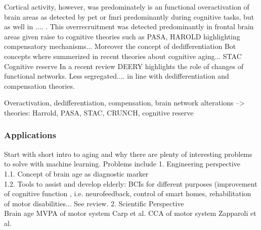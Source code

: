Cortical activity, however, was predominately  is an functional overactivation of brain areas as detected by \gls{pet} or \gls{fmri} predominantly during cognitive tasks, but as well in .... \cite{Fjell2010,Reuter-Lorenz2010}. This overrecruitment was detected predominantly in frontal brain areas given raise to cognitive theories such as PASA, HAROLD highlighting compensatory mechanisms... Moreover the concept of dedifferentiation 
Bot concepts where summerized in recent theories about cognitive aging... STAC 
Cognitive reserve  
In a recent review DEERY highlights the role of changes of functional networks. Less segregated.... in line with dedifferentiation and compensation theories. 
\cite{Deery2023}


Overactivation, dedifferentiation, compensation, brain network alterations --> theories:  Harrold, PASA, STAC, CRUNCH, cognitive reserve

\subsubsection{Applications}
Start with short intro to aging and why there are plenty of interesting problems to solve with machine learning. Problems include
1. Engineering perspective\\
1.1. Concept of brain age as diagnostic marker\\  
1.2. Tools to assist and develop elderly: BCIs for different purposes (improvement of cognitive function  , i.e. neurofeedback, control of smart homes, rehabilitation of motor disabilities... See review. 
2. Scientific Perspective\\
Brain age 
MVPA of motor system Carp et al. 
CCA of motor system Zapparoli et al.





